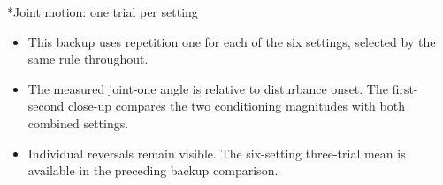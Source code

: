 \documentclass[12pt,a4paper]{article}
\makeatletter
\renewcommand\section{\@startsection{section}{1}{0pt}{14pt}{6pt}{\normalfont\Large\bfseries\color{navy}}}
\makeatother
\begin{document}
\section*{Joint motion: one trial per setting}
\begin{itemize}
\item This backup uses repetition one for each of the six settings, selected by the same rule throughout.
\item The measured joint-one angle is relative to disturbance onset. The first-second close-up compares the two conditioning magnitudes with both combined settings.
\item Individual reversals remain visible. The six-setting three-trial mean is available in the preceding backup comparison.
\end{itemize}
\end{document}
